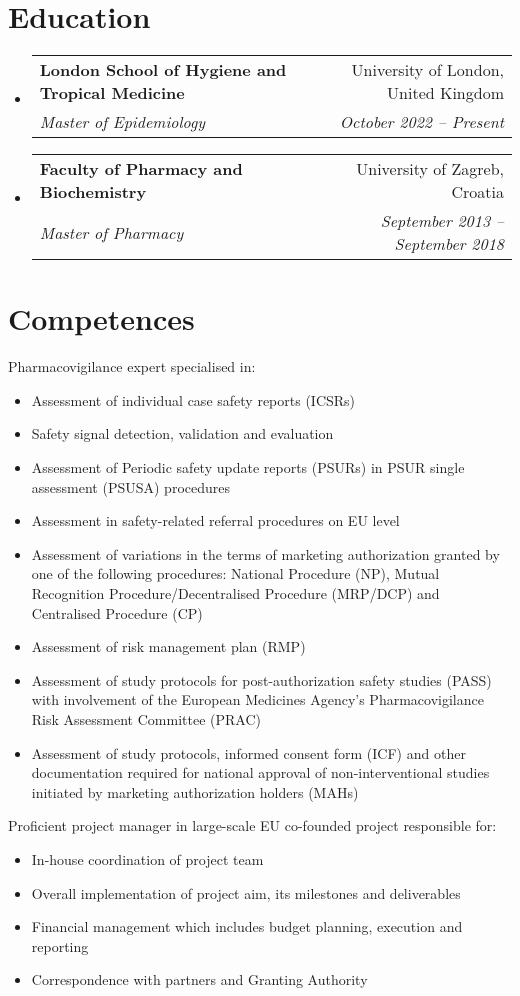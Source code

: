 \documentclass[letterpaper,11pt]{article}
\makeatletter
\newcommand{\resumeSubheading}[4]{
  \vspace{-2pt}\item
    \begin{tabular*}{0.97\textwidth}[t]{l@{\extracolsep{\fill}}r}
      \textbf{#1} & #2 \\
      \textit{\small#3} & \textit{\small #4} \\
    \end{tabular*}\vspace{-7pt}
}
\newcommand{\resumeSubHeadingListStart}{\begin{itemize}[leftmargin=0.15in, label={}]}
\newcommand{\resumeSubHeadingListEnd}{\end{itemize}}
\makeatother
\begin{document}
\section{{Education}}
  \resumeSubHeadingListStart
      \resumeSubheading
      {{London School of Hygiene and Tropical Medicine}}{University of London, United Kingdom}
      {Master of Epidemiology}{October 2022 -- Present}
    \resumeSubheading
      {{Faculty of Pharmacy and Biochemistry}}{University of Zagreb, Croatia}
      {Master of Pharmacy}{September 2013 -- September 2018}
  \resumeSubHeadingListEnd
%
\section{{Competences}} 
Pharmacovigilance expert specialised in:
\begin{itemize}
\item Assessment of individual case safety reports (ICSRs)
\item Safety signal detection, validation and evaluation
\item Assessment of Periodic safety update reports (PSURs) in PSUR single assessment (PSUSA) procedures
\item Assessment in safety-related referral procedures on EU level
\item Assessment of variations in the terms of marketing authorization granted by one of the following procedures: National Procedure (NP), Mutual Recognition Procedure/Decentralised Procedure (MRP/DCP) and Centralised Procedure (CP)
\item Assessment of risk management plan (RMP)
\item Assessment of study protocols for post-authorization safety studies (PASS) with involvement of the European Medicines Agency's Pharmacovigilance Risk Assessment Committee (PRAC)
\item Assessment of study protocols, informed consent form (ICF) and other documentation required for national approval of non-interventional studies initiated by marketing authorization holders (MAHs)
\end{itemize}

Proficient project manager in large-scale EU co-founded project responsible for:
\begin{itemize}
\item In-house coordination of project team 
\item Overall implementation of project aim, its milestones and deliverables
\item Financial management which includes budget planning, execution and reporting
\item Correspondence with partners and Granting Authority
\end{itemize}
\end{document}
